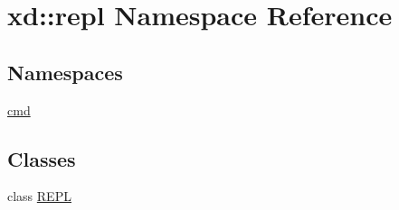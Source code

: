 \hypertarget{namespacexd_1_1repl}{}\section{xd\+:\+:repl Namespace Reference}
\label{namespacexd_1_1repl}
\subsection*{Namespaces}
\begin{DoxyCompactItemize}
\item 
 \mbox{\hyperlink{namespacexd_1_1repl_1_1cmd}{cmd}}
\end{DoxyCompactItemize}
\subsection*{Classes}
\begin{DoxyCompactItemize}
\item 
class \mbox{\hyperlink{classxd_1_1repl_1_1_r_e_p_l}{R\+E\+PL}}
\end{DoxyCompactItemize}
